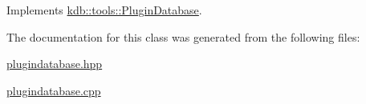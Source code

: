 Implements \mbox{\hyperlink{classkdb_1_1tools_1_1PluginDatabase_a43abe56a024218ecee48526ced699f05}{kdb\+::tools\+::\+Plugin\+Database}}.



The documentation for this class was generated from the following files\+:\begin{DoxyCompactItemize}
\item 
\mbox{\hyperlink{plugindatabase_8hpp}{plugindatabase.\+hpp}}\item 
\mbox{\hyperlink{plugindatabase_8cpp}{plugindatabase.\+cpp}}\end{DoxyCompactItemize}
